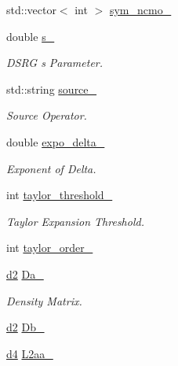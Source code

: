 \begin{DoxyCompactItemize}
std\+::vector$<$ int $>$ \mbox{\hyperlink{classforte_1_1_m_c_s_r_g_p_t2___m_o_af83573819da4037ce8fc574d9a0c0be8}{sym\+\_\+ncmo\+\_\+}}
\item 
double \mbox{\hyperlink{classforte_1_1_m_c_s_r_g_p_t2___m_o_a95045d8bd52ded5f72c1022374da2299}{s\+\_\+}}
\begin{DoxyCompactList}\small\item\em D\+S\+RG s Parameter. \end{DoxyCompactList}\item 
std\+::string \mbox{\hyperlink{classforte_1_1_m_c_s_r_g_p_t2___m_o_a997e8df570d59a3f4b190bb6db57f1ea}{source\+\_\+}}
\begin{DoxyCompactList}\small\item\em Source Operator. \end{DoxyCompactList}\item 
double \mbox{\hyperlink{classforte_1_1_m_c_s_r_g_p_t2___m_o_ac8e317c80e4668f24891096ee21e8f54}{expo\+\_\+delta\+\_\+}}
\begin{DoxyCompactList}\small\item\em Exponent of Delta. \end{DoxyCompactList}\item 
int \mbox{\hyperlink{classforte_1_1_m_c_s_r_g_p_t2___m_o_ae59121f5f7ba5f30aa06d9c0de2d711a}{taylor\+\_\+threshold\+\_\+}}
\begin{DoxyCompactList}\small\item\em Taylor Expansion Threshold. \end{DoxyCompactList}\item 
int \mbox{\hyperlink{classforte_1_1_m_c_s_r_g_p_t2___m_o_a0801d6bbeb8d5ab5161d0b27f683f932}{taylor\+\_\+order\+\_\+}}
\item 
\mbox{\hyperlink{mcsrgpt2__mo_8h_ae5de8a172a3b363a852d6d32e6d90537}{d2}} \mbox{\hyperlink{classforte_1_1_m_c_s_r_g_p_t2___m_o_adf0fe66b1a0b06c10ff7a159da57cd6a}{Da\+\_\+}}
\begin{DoxyCompactList}\small\item\em Density Matrix. \end{DoxyCompactList}\item 
\mbox{\hyperlink{mcsrgpt2__mo_8h_ae5de8a172a3b363a852d6d32e6d90537}{d2}} \mbox{\hyperlink{classforte_1_1_m_c_s_r_g_p_t2___m_o_af56fe01444a0c47e5e6da37fe35e29e0}{Db\+\_\+}}
\item 
\mbox{\hyperlink{mcsrgpt2__mo_8h_a0a2245afece5cd37d3b0b6a462927f69}{d4}} \mbox{\hyperlink{classforte_1_1_m_c_s_r_g_p_t2___m_o_a08df4573012bd9b084446827e50270d1}{L2aa\+\_\+}}

\end{DoxyCompactItemize}
